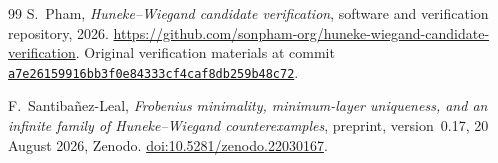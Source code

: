 \documentclass[11pt,letterpaper]{article}
\theoremstyle{remark}
\numberwithin{equation}{section}
\begin{document}
\begin{thebibliography}{99}
S.~Pham, \emph{Huneke--Wiegand candidate verification},
software and verification repository, 2026.
\url{https://github.com/sonpham-org/huneke-wiegand-candidate-verification}.
Original verification materials at commit
\href{https://github.com/sonpham-org/huneke-wiegand-candidate-verification/tree/a7e26159916bb3f0e84333cf4caf8db259b48c72}{\texttt{a7e26159916bb3f0e84333cf4caf8db259b48c72}}.

F.~Santiba\~nez-Leal,
\emph{Frobenius minimality, minimum-layer uniqueness, and an infinite family of Huneke--Wiegand counterexamples},
preprint, version~0.17, 20 August 2026, Zenodo.
\href{https://doi.org/10.5281/zenodo.22030167}{doi:10.5281/zenodo.22030167}.
\end{thebibliography}
\endgroup
\end{document}
